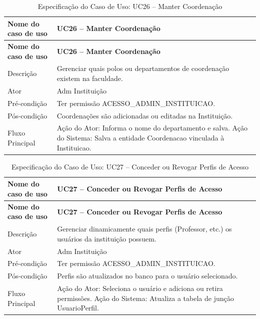 \fonteautores

\vspace{\baselineskip}

\Needspace{0.48\textheight}
\begin{longtable}{|L{4.5cm}|L{10.5cm}|}
\caption{Especificação do Caso de Uso: UC26 -- Manter Coordenação} \\
\hline
\textbf{Nome do caso de uso} & \textbf{UC26 -- Manter Coordenação} \\
\hline
\endfirsthead
\hline
\textbf{Nome do caso de uso} & \textbf{UC26 -- Manter Coordenação} \\
\hline
\endhead
Descrição       & Gerenciar quais polos ou departamentos de coordenação existem na faculdade. \\
\hline
Ator            & Adm Instituição \\
\hline
Pré-condição    & Ter permissão ACESSO\_ADMIN\_INSTITUICAO. \\
\hline
Pós-condição    & Coordenações são adicionadas ou editadas na Instituição. \\
\hline
Fluxo Principal & Ação do Ator: Informa o nome do departamento e salva. Ação do Sistema: Salva a entidade Coordenacao vinculada à Instituicao. \\
\hline
\end{longtable}

\fonteautores

\vspace{\baselineskip}

\Needspace{0.48\textheight}
\begin{longtable}{|L{4.5cm}|L{10.5cm}|}
\caption{Especificação do Caso de Uso: UC27 -- Conceder ou Revogar Perfis de Acesso} \\
\hline
\textbf{Nome do caso de uso} & \textbf{UC27 -- Conceder ou Revogar Perfis de Acesso} \\
\hline
\endfirsthead
\hline
\textbf{Nome do caso de uso} & \textbf{UC27 -- Conceder ou Revogar Perfis de Acesso} \\
\hline
\endhead
Descrição       & Gerenciar dinamicamente quais perfis (Professor, etc.) os usuários da instituição possuem. \\
\hline
Ator            & Adm Instituição \\
\hline
Pré-condição    & Ter permissão ACESSO\_ADMIN\_INSTITUICAO. \\
\hline
Pós-condição    & Perfis são atualizados no banco para o usuário selecionado. \\
\hline
Fluxo Principal & Ação do Ator: Seleciona o usuário e adiciona ou retira permissões. Ação do Sistema: Atualiza a tabela de junção UsuarioPerfil. \\
\hline
\end{longtable}

